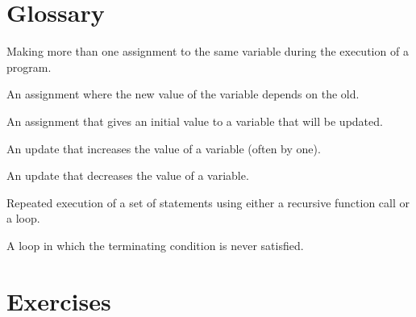 \section{Glossary}

\begin{vocabulary} Making more than one assignment to the same
variable during the execution of a program.
\end{vocabulary}
	
\begin{vocabulary}[update:] An assignment where the new value of the variable
depends on the old.
\end{vocabulary}
	
\begin{vocabulary}[initialization:] An assignment that gives an initial value to
a variable that will be updated.
\end{vocabulary}
	
\begin{vocabulary}[increment:] An update that increases the value of a variable
(often by one).
\end{vocabulary}
	
\begin{vocabulary}[decrement:] An update that decreases the value of a variable.
\end{vocabulary}
	
\begin{vocabulary}[iteration:] Repeated execution of a set of statements using
either a recursive function call or a loop.
\end{vocabulary}
	
\begin{vocabulary} A loop in which the terminating condition is
never satisfied.
\end{vocabulary}


\section{Exercises}

